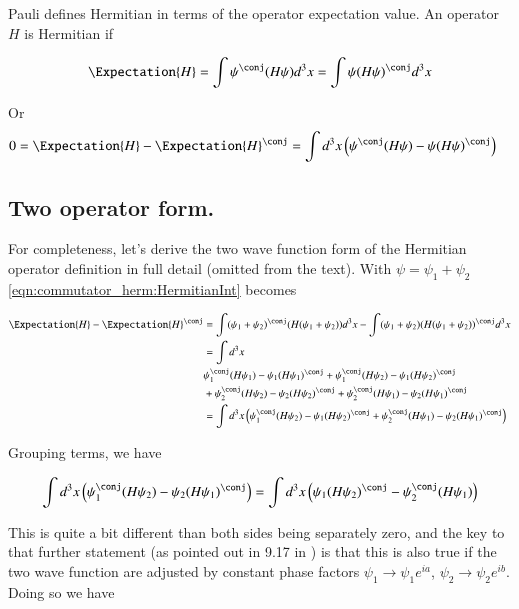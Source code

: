 Pauli defines Hermitian in terms of the operator expectation value.  An operator $H$ is Hermitian if

\begin{align}\label{eqn:commutator_herm:Hermitian}
\Expectation{H} = \int \psi^\conj (H \psi) d^3 x = \int \psi (H \psi)^\conj d^3 x
\end{align}

Or
\begin{align}\label{eqn:commutator_herm:HermitianInt}
0 &= \Expectation{H} - \Expectation{H}^\conj = \int d^3 x \left( \psi^\conj (H \psi) - \psi (H \psi)^\conj \right)
\end{align}

\subsection{Two operator form. }

For completeness, let's derive the two wave function form of the Hermitian operator definition in full detail (omitted from the text).  With $\psi = \psi_1 + \psi_2$
\ref{eqn:commutator_herm:HermitianInt} becomes

\begin{align*}
\Expectation{H} - \Expectation{H}^\conj
&= \int (\psi_1 + \psi_2)^\conj (H (\psi_1 + \psi_2)) d^3 x - \int (\psi_1 + \psi_2) (H (\psi_1 + \psi_2))^\conj d^3 x \\
&= \int d^3 x \\
&\psi_1^\conj (H \psi_1) - \psi_1 (H \psi_1)^\conj 
+\psi_1^\conj (H \psi_2) - \psi_1 (H \psi_2)^\conj \\
&+\psi_2^\conj (H \psi_2) - \psi_2 (H \psi_2)^\conj 
+\psi_2^\conj (H \psi_1) - \psi_2 (H \psi_1)^\conj \\
&= \int d^3 x
\left( \psi_1^\conj (H \psi_2) - \psi_1 (H \psi_2)^\conj 
+\psi_2^\conj (H \psi_1) - \psi_2 (H \psi_1)^\conj \right) \\
\end{align*}

Grouping terms, we have 

\begin{align*}
\int d^3 x \left( \psi_1^\conj (H \psi_2) - \psi_2 (H \psi_1)^\conj \right) = \int d^3 x \left( \psi_1 (H \psi_2)^\conj - \psi_2^\conj (H \psi_1) \right)
\end{align*}

This is quite a bit different than both sides being separately zero, and the key to that further statement (as pointed out in 9.17 in \cite{bohm1989qt}) 
is that this is also true if the two wave function are adjusted by constant phase factors
$\psi_1 \rightarrow \psi_1 e^{ia}$, 
$\psi_2 \rightarrow \psi_2 e^{ib}$.  Doing so we have


